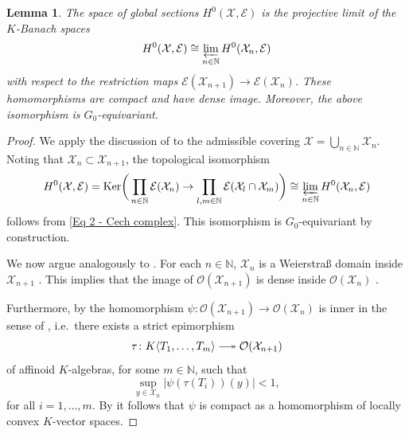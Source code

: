 \documentclass[a4paper, reqno, 10pt]{amsart}
\newtheorem{lemma}[theorem]{Lemma}
\theoremstyle{definition}
\numberwithin{equation}{section}
\newcommand{\abs}[1]{{\lvert{#1}\rvert}}
\newcommand{\Ker}{{\mathrm{Ker}}}
\newcommand{\ra}{\rightarrow}
\newcommand{\BN}{{\mathbb {N}}}
\newcommand{\CE}{{\mathcal {E}}}
\newcommand{\CO}{{\mathcal {O}}}
\newcommand{\CX}{{\mathcal {X}}}
\DeclareRobustCommand\longtwoheadrightarrow
{\relbar\joinrel\twoheadrightarrow}
\begin{document}
\begin{lemma}\label{Lemma 2 - Description of sections of DHS as projective limit}
	The space of global sections $H^0(\CX,\CE)$ is the projective limit of the $K$-Banach spaces
	\[H^0 (\CX,\CE) \cong \varprojlim_{n\in\BN} H^0(\CX_n,\CE) \]
	with respect to the restriction maps $\CE(\CX_{n+1})\ra \CE(\CX_{n})$.
	These homomorphisms are compact and have dense image.
	Moreover, the above isomorphism is $G_0$-equivariant.
\end{lemma}
\begin{proof}
	We apply the discussion of  to the admissible covering $\CX = \bigcup_{n\in \BN} \CX_{n}$.
	Noting that $\CX_{n} \subset \CX_{n+1}$, the topological isomorphism
	\begin{align*}
		H^0 (\CX,\CE) = \Ker \bigg( \prod_{n\in \BN} \CE(\CX_n) \ra \prod_{l,m \in \BN} \CE(\CX_{l}\cap \CX_{m}) \bigg) \cong \varprojlim_{n\in\BN} H^0(\CX_n,\CE)
	\end{align*}
	follows from \eqref{Eq 2 - Cech complex}.
	This isomorphism is $G_0$-equivariant by construction.
	
	We now argue analogously to \cite[\S 1 Prop.\ 4]{SchneiderTeitelbaum02pAdicBoundVal}. 
	For each $n\in \BN$, $\CX_n$ is a Weierstra{\ss} domain inside $\CX_{n+1}$ \cite[\S 1, Proof of Prop.\ 4]{SchneiderStuhler91CohompAdicSymSp}.
	This implies that the image of $\CO(\CX_{n+1})$ is dense inside $\CO(\CX_{n})$ \cite[7.3.4 Prop.\ 2]{BoschGuentzerRemmert84NonArchAna}.
	
	
	Furthermore, by \cite[\S 1, Proof of Prop.\ 4]{SchneiderStuhler91CohompAdicSymSp} the homomorphism $\psi \colon \CO(\CX_{n+1}) \ra \CO(\CX_{n})$ is inner in the sense of \cite[Def.\ 2.5.1]{Berkovich90SpecThAnGeom}, i.e.\ there exists a strict epimorphism
	\begin{equation*}
		\tau \colon K \langle T_1,\ldots, T_m \rangle \longtwoheadrightarrow \CO(\CX_{n+1})
	\end{equation*}
	of affinoid $K$-algebras, for some $m\in \BN$, such that 
	\begin{equation*}
		\sup_{y \in \CX_n} \abs{ \psi(\tau(T_i))(y)} <1,
	\end{equation*}
	for all $i=1,\ldots,m$.
	By \cite[\S 1 Lemma 5]{SchneiderTeitelbaum02pAdicBoundVal} it follows that $\psi$ is compact as a homomorphism of locally convex $K$-vector spaces.
	

\end{proof}
\end{document}
